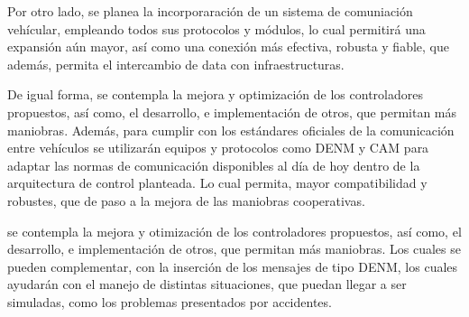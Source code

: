 \par Por otro lado, se planea la incorporaración de un sistema de comuniación vehícular, empleando todos sus protocolos y módulos, lo cual permitirá una expansión aún mayor, así como una conexión más efectiva, robusta y fiable, que además, permita el intercambio de data con infraestructuras.\\

\par De igual forma, se contempla la mejora y optimización de los controladores propuestos, así como, el desarrollo, e implementación de otros, que permitan más maniobras. Además, para cumplir con los estándares oficiales de la comunicación entre vehículos se utilizarán equipos y protocolos como DENM y CAM para adaptar las normas de comunicación disponibles al día de hoy dentro de la arquitectura de control planteada. Lo cual permita, mayor compatibilidad y robustes, que de paso a la mejora de las maniobras cooperativas.   

 se contempla la mejora y otimización de los controladores propuestos, así como, el desarrollo, e implementación de otros, que permitan más maniobras. Los cuales se pueden complementar, con la inserción de los mensajes de tipo DENM, los cuales ayudarán con el manejo de distintas situaciones, que puedan llegar a ser simuladas, como los problemas presentados por accidentes.  